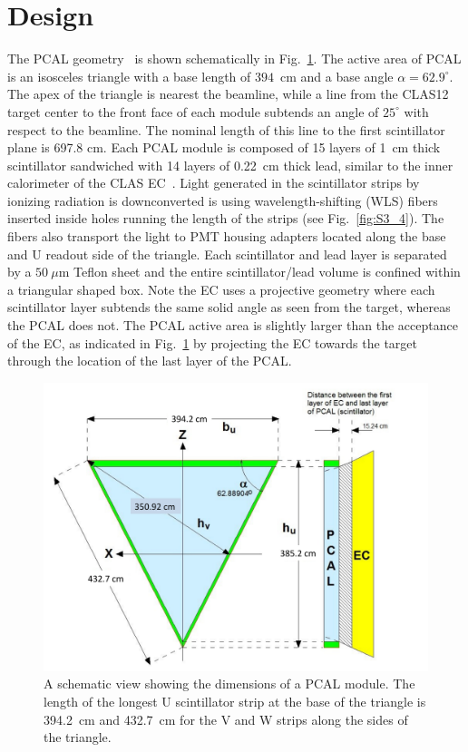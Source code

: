 \section{Design} \label{Design}

The PCAL geometry~\cite{2015002} is shown schematically in Fig.~\ref{fig:S3_1}. The
active area of PCAL is an isosceles triangle with a base length of $394$~cm and a base angle $\alpha=62.9^\circ$.
The apex of the triangle is nearest the beamline, while a line from the CLAS12 target center to the front face of each
module subtends an angle of $25^\circ$ with respect to the beamline. The nominal length of this line to the first scintillator plane is 697.8 cm. Each PCAL module is composed of 15
layers of 1~cm thick scintillator sandwiched with 14 layers of 0.22~cm thick lead, similar to the inner calorimeter of the CLAS EC~\cite{clas6nim}. Light generated in the scintillator strips by ionizing radiation is downconverted is using wavelength-shifting (WLS) fibers inserted inside holes running the length of the strips (see Fig.~\ref{fig:S3_4}). The fibers also transport the light to PMT housing adapters located along the base and U readout side of the triangle.  Each scintillator and lead layer is separated by a $50~\mu$m Teflon sheet and the entire
scintillator/lead volume is confined within a triangular shaped box. Note the EC uses a projective geometry
where each scintillator layer subtends the same solid angle as seen from the target, whereas the PCAL does
not. The PCAL active area is slightly larger than the acceptance of the EC, as indicated in Fig.~\ref{fig:S3_1} by projecting the EC towards the target through the location of the last layer of the PCAL.  

\begin{figure}[h]
\centering
\includegraphics[width=1.0\columnwidth,keepaspectratio]{img/S3_1.pdf}
\caption[Schematic plot of PCAL]{A schematic view showing the dimensions of a PCAL module. The length
of the longest U scintillator strip at the base of the triangle is 394.2~cm and 432.7~cm for the V
and W strips along the sides of the triangle. }
\label{fig:S3_1}
\end{figure}


